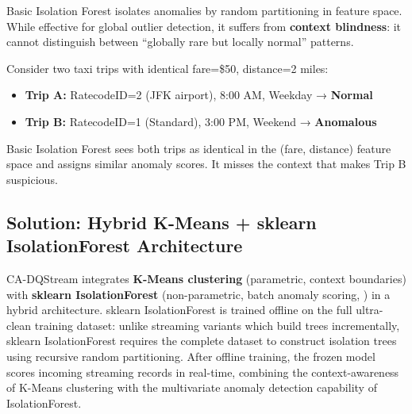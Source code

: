 Basic Isolation Forest \citep{liu2008isolation} isolates anomalies by random partitioning in feature space. While effective for global outlier detection, it suffers from \textbf{context blindness}: it cannot distinguish between ``globally rare but locally normal'' patterns.

Consider two taxi trips with identical fare=\$50, distance=2 miles:
\begin{itemize}
    \item \textbf{Trip A:} RatecodeID=2 (JFK airport), 8:00 AM, Weekday → \textbf{Normal}
    \item \textbf{Trip B:} RatecodeID=1 (Standard), 3:00 PM, Weekend → \textbf{Anomalous}
\end{itemize}

Basic Isolation Forest sees both trips as identical in the (fare, distance) feature space and assigns similar anomaly scores. It misses the context that makes Trip B suspicious.

\subsection{Solution: Hybrid K-Means + sklearn IsolationForest Architecture}

CA-DQStream integrates \textbf{K-Means clustering} (parametric, context boundaries) with \textbf{sklearn IsolationForest} (non-parametric, batch anomaly scoring, \citep{liu2008isolation, sklearn_api}) in a hybrid architecture. sklearn IsolationForest is trained offline on the full ultra-clean training dataset: unlike streaming variants which build trees incrementally, sklearn IsolationForest requires the complete dataset to construct isolation trees using recursive random partitioning. After offline training, the frozen model scores incoming streaming records in real-time, combining the context-awareness of K-Means clustering with the multivariate anomaly detection capability of IsolationForest.

